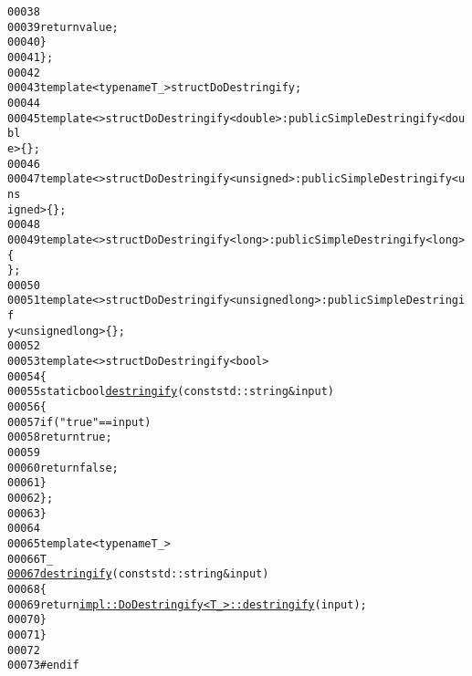 \begin{footnotesize}
\begin{alltt}
00038 
00039                 \textcolor{keywordflow}{return} value;
00040             \}
00041         \};
00042 
00043         \textcolor{keyword}{template} <\textcolor{keyword}{typename} T\_> \textcolor{keyword}{struct }DoDestringify;
00044 
00045         \textcolor{keyword}{template} <> \textcolor{keyword}{struct }DoDestringify<double> : \textcolor{keyword}{public} SimpleDestringify<doubl
      e> \{\};
00046 
00047         \textcolor{keyword}{template} <> \textcolor{keyword}{struct }DoDestringify<unsigned> : \textcolor{keyword}{public} SimpleDestringify<uns
      igned> \{\};
00048 
00049         \textcolor{keyword}{template} <> \textcolor{keyword}{struct }DoDestringify<long> : \textcolor{keyword}{public} SimpleDestringify<long> \{
      \};
00050 
00051         \textcolor{keyword}{template} <> \textcolor{keyword}{struct }DoDestringify<unsigned long> : \textcolor{keyword}{public} SimpleDestringif
      y<unsigned long> \{\};
00052 
00053         \textcolor{keyword}{template} <> \textcolor{keyword}{struct }DoDestringify<bool>
00054         \{
00055             \textcolor{keyword}{static} \textcolor{keywordtype}{bool} \hyperlink{namespaceeos_ad3134beb65a048a00ed3607d0af90202}{destringify}(\textcolor{keyword}{const} std::string & input)
00056             \{
00057                 \textcolor{keywordflow}{if} (\textcolor{stringliteral}{"true"} == input)
00058                     \textcolor{keywordflow}{return} \textcolor{keyword}{true};
00059 
00060                 \textcolor{keywordflow}{return} \textcolor{keyword}{false};
00061             \}
00062         \};
00063     \}
00064 
00065     \textcolor{keyword}{template} <\textcolor{keyword}{typename} T\_>
00066     T\_
\hypertarget{destringify_8hh_source_l00067}{}\hyperlink{namespaceeos_ad3134beb65a048a00ed3607d0af90202}{00067}     \hyperlink{namespaceeos_ad3134beb65a048a00ed3607d0af90202}{destringify}(\textcolor{keyword}{const} std::string & input)
00068     \{
00069         \textcolor{keywordflow}{return} \hyperlink{namespaceeos_ad3134beb65a048a00ed3607d0af90202}{impl::DoDestringify<T_>::destringify}(input);
00070     \}
00071 \}
00072 
00073 \textcolor{preprocessor}{#endif}
\end{alltt}\end{footnotesize}
